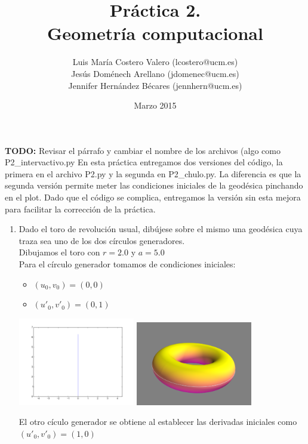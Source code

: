 \documentclass[12pt,a4paper]{article}
\title{Práctica 2. \\ Geometría computacional}
\author{Luis María Costero Valero (lcostero@ucm.es)\\ Jesús Doménech
  Arellano (jdomenec@ucm.es) \\ Jennifer Hernández Bécares (jennhern@ucm.es)}
\date{Marzo 2015}
\newcommand{\todo}[1]{{\large \color{red} \textbf{TODO: }#1 }}
\begin{document}
\maketitle

\todo{Revisar el párrafo y cambiar el nombre de los archivos (algo como P2\_intervactivo.py}
En esta práctica entregamos dos versiones del código, la primera en el
archivo P2.py y la segunda en P2\_chulo.py. La diferencia es que la
segunda versión permite meter las condiciones iniciales de la
geodésica pinchando en el plot. Dado que el código se complica,
entregamos la versión sin esta mejora para facilitar la corrección de
la práctica.

\begin{enumerate}
\item Dado el toro de revolución usual, dibújese sobre el mismo una
  geodésica cuya traza sea uno de los dos círculos generadores.\\
  Dibujamos el toro con $r = 2.0$ y $a = 5.0$ \\
  Para el círculo generador tomamos de condiciones iniciales:
  \begin{itemize}
  \item $(u_0, v_0) = (0, 0)$
  \item $(u'_0, v'_0) = (0, 1)$
  \end{itemize}

  \begin{center}
    \includegraphics[width=0.4\textwidth]{./img/circulo1_trace.png}
    \includegraphics[width=0.4\textwidth]{./img/circulo1_surface.png}
  \end{center}

  El otro cículo generador se obtiene al establecer las derivadas iniciales
  como\\ $(u'_0, v'_0) = (1, 0)$


\end{enumerate}
\end{document}
